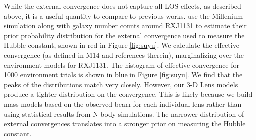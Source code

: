 While the external convergence does not capture all LOS effects, as described above, it is a useful quantity to compare to previous works. \citet{Suyu13} use the Millenium simulation along with galaxy number counts around RXJ1131 to estimate their prior probability distribution for the external convergence used to measure the Hubble constant, shown in red in Figure \ref{fig:suyu}. We calculate the effective convergence (as defined in M14 and references therein), marginalizing over the environment models for RXJ1131. The histogram of effective convergence for 1000 environment trials is shown in blue in Figure \ref{fig:suyu}. We find that the peaks of the distributions match very closely. However, our 3-D Lens models produce a tighter distribution on the convergence. This is likely because we build mass models based on the observed beam for each individual lens rather than using statistical results from N-body simulations. The narrower distribution of external convergences translates into a stronger prior on measuring the Hubble constant.